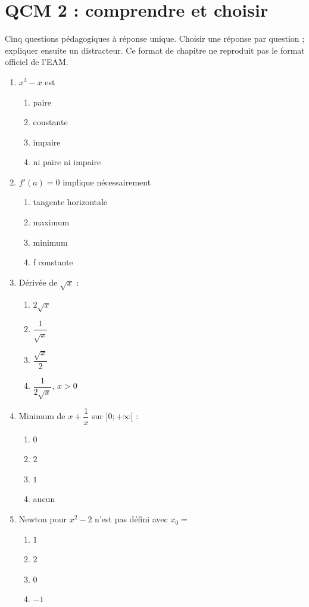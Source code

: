 \endgroup
\begingroup\small
{}\section*{QCM 2 : comprendre et choisir}\label{C06-Q2}
Cinq questions pédagogiques à réponse unique. Choisir une réponse par question ; expliquer ensuite un distracteur. Ce format de chapitre ne reproduit pas le format officiel de l’EAM.
\begin{enumerate}
\item $x^3-x$ est
\begin{enumerate}[label=\Alph*.,itemsep=2pt]
\item paire
\item constante
\item impaire
\item ni paire ni impaire
\end{enumerate}
\item $f\prime(a)=0$ implique nécessairement
\begin{enumerate}[label=\Alph*.,itemsep=2pt]
\item tangente horizontale
\item maximum
\item minimum
\item f constante
\end{enumerate}
\item Dérivée de $\sqrt x$ :
\begin{enumerate}[label=\Alph*.,itemsep=2pt]
\item $2\sqrt x$
\item $\dfrac{1}{\sqrt x}$
\item $\dfrac{\sqrt x}{2}$
\item $\dfrac{1}{2\sqrt x}$, $x>0$
\end{enumerate}
\item Minimum de $x+\dfrac{1}{x}$ sur $]0;+\infty[$ :
\begin{enumerate}[label=\Alph*.,itemsep=2pt]
\item $0$
\item $2$
\item $1$
\item aucun
\end{enumerate}
\item Newton pour $x^2-2$ n’est pas défini avec $x_0=$
\begin{enumerate}[label=\Alph*.,itemsep=2pt]
\item $1$
\item $2$
\item $0$
\item $-1$
\end{enumerate}
\end{enumerate}
